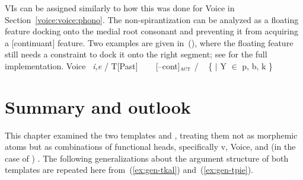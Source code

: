 {\ex
{}
\xe

VIs can be assigned similarly to how this was done for Voice in Section~\ref{voice:voice:phono}. The non-spirantization can be analyzed as a floating feature docking onto the medial root consonant and preventing it from acquiring a [continuant] feature. Two examples are given in~(\nextx), where the floating feature still needs a constraint to dock it onto the right segment; see \cite{kastner18nllt} for the full implementation.
\pex
	\a\label{vi:voice2}	Voice \lra~\emph{i,e} / T[Past] \trace~\va
			\a\label{vi:va}\va~\lra~[--cont]$_{\gsc{ACT}}$ / \trace~ \{  $|$ Y $\in$ p, b, k \}
			
\xe

\section{Summary and outlook} \label{voice:conc}
This chapter examined the two templates {\tkal} and {\tpie}, treating them not as morphemic atoms but as combinations of functional heads, specifically v, Voice, and (in the case of {\tpie}) {\va}. The following generalizations about the argument structure of both templates are repeated here from~(\ref{ex:gen-tkal}) and~(\ref{ex:gen-tpie}).

}
